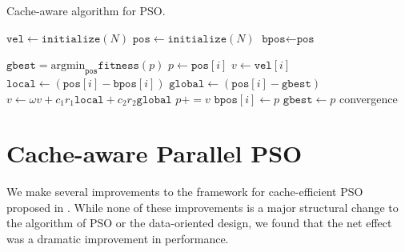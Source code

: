 \begin{algorithm}
  \caption{Cache-aware algorithm for PSO.}\label{alg:pso-cache}
  \begin{algorithmic}[1]
    \State $\texttt{vel} \gets \texttt{initialize}(N)$ 
    \State $\texttt{pos} \gets \texttt{initialize}(N)$ 
    \State $\texttt{bpos} \gets \texttt{pos}$ 

    \Repeat
    \State $\texttt{gbest} = \text{argmin}_{\texttt{pos}}\texttt{fitness}(p)$
    \State $p \gets \texttt{pos}[i]$
    \State $v \gets \texttt{vel}[i]$
    \State $\texttt{local} \gets (\texttt{pos}[i] -
    \texttt{bpos}[i])$
    \State $\texttt{global} \gets  (\texttt{pos}[i]
    - \texttt{gbest})$
    \State $v \gets \omega v + c_1 r_1 \texttt{local}  + c_2 r_2 \texttt{global}$
    \State $p += v$
      \State $\texttt{bpos}[i] \gets p$
      \State $\texttt{gbest} \gets p$
      \EndIf
    \EndIf
    \EndFor
    \Until convergence
    \EndProcedure
  \end{algorithmic}
\end{algorithm}

\section{Cache-aware Parallel PSO}\label{sec:algo}
We make several improvements to the framework for cache-efficient PSO proposed
in \cite{cache-pso}. While none of these improvements is a major structural
change to the algorithm of PSO or the data-oriented design, we found that the
net effect was a dramatic improvement in performance.

